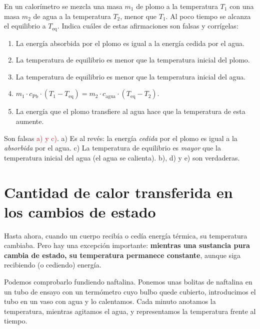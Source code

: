 \begin{exercise}
    En un calorímetro se mezcla una masa \(m_1\) de plomo a la temperatura \(T_1\) con una masa \(m_2\) de agua a la temperatura \(T_2\), menor que \(T_1\). Al poco tiempo se alcanza el equilibrio a \(T_{\text{eq}}\). Indica cuáles de estas afirmaciones son falsas y corrígelas:
    \begin{enumerate}[label=\alph*)]
        \item La energía absorbida por el plomo es igual a la energía cedida por el agua.
        \item La temperatura de equilibrio es menor que la temperatura inicial del plomo.
        \item La temperatura de equilibrio es menor que la temperatura inicial del agua.
        \item \(m_1 \cdot c_{\text{Pb}} \cdot (T_1 - T_{\text{eq}}) = m_2 \cdot c_{\text{agua}} \cdot (T_{\text{eq}} - T_2)\).
        \item La energía que el plomo transfiere al agua hace que la temperatura de esta aumente.
    \end{enumerate}
    \begin{solu}
        Son falsas \textcolor{red}{a) y c)}. a) Es al revés: la energía \emph{cedida} por el plomo es igual a la \emph{absorbida} por el agua. c) La temperatura de equilibrio es \emph{mayor} que la temperatura inicial del agua (el agua se calienta). b), d) y e) son verdaderas.
    \end{solu}
\end{exercise}

\section[Calor en los cambios de estado]{Cantidad de calor transferida en los cambios de estado}

Hasta ahora, cuando un cuerpo recibía o cedía energía térmica, su temperatura cambiaba. Pero hay una excepción importante: \textbf{mientras una sustancia pura cambia de estado, su temperatura permanece constante}, aunque siga recibiendo (o cediendo) energía.

Podemos comprobarlo fundiendo naftalina. Ponemos unas bolitas de naftalina en un tubo de ensayo con un termómetro cuyo bulbo quede cubierto, introducimos el tubo en un vaso con agua y lo calentamos. Cada minuto anotamos la temperatura, mientras agitamos el agua, y representamos la temperatura frente al tiempo.

